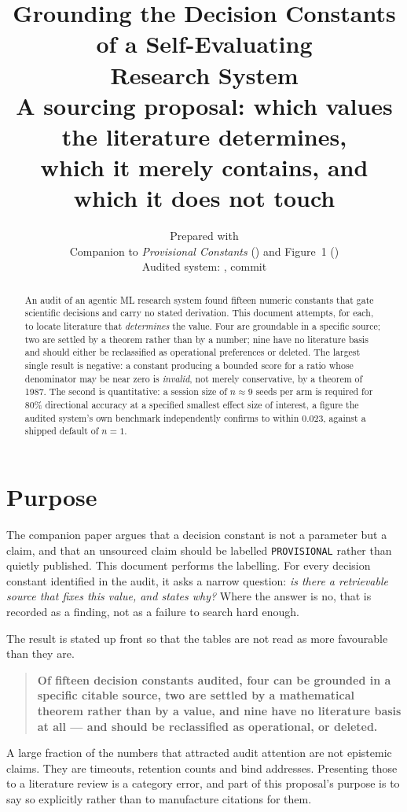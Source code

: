 \documentclass[11pt,letterpaper]{article}
\title{\textbf{Grounding the Decision Constants of a Self-Evaluating\\ Research System}\\[6pt]
\large A sourcing proposal: which values the literature determines,\\ which it
merely contains, and which it does not touch}
\author{
  \normalsize Prepared with \code{opencode}\\[3pt]
  \small Companion to \emph{Provisional Constants} (\code{paper.pdf}) and Figure~1
  (\code{flow.pdf})\\
  \small Audited system: \code{github.com/cloudcell/labloop}, commit \code{21d91f1}
}
\date{}
\newcommand{\code}[1]{\texttt{#1}}
\begin{document}
\maketitle

\begin{abstract}
An audit of an agentic ML research system found fifteen numeric constants that
gate scientific decisions and carry no stated derivation. This document attempts,
for each, to locate literature that \emph{determines} the value. Four are
groundable in a specific source; two are settled by a theorem rather than by a
number; nine have no literature basis and should either be reclassified as
operational preferences or deleted. The largest single result is negative: a
constant producing a bounded score for a ratio whose denominator may be near
zero is \emph{invalid}, not merely conservative, by a theorem of 1987. The
second is quantitative: a session size of $n \approx 9$ seeds per arm is required
for 80\% directional accuracy at a specified smallest effect size of interest, a
figure the audited system's own benchmark independently confirms to within
$0.023$, against a shipped default of $n = 1$.
\end{abstract}

\section{Purpose}

The companion paper argues that a decision constant is not a parameter but a
claim, and that an unsourced claim should be labelled \code{PROVISIONAL} rather
than quietly published. This document performs the labelling. For every decision
constant identified in the audit, it asks a narrow question: \emph{is there a
retrievable source that fixes this value, and states why?} Where the answer is
no, that is recorded as a finding, not as a failure to search hard enough.

The result is stated up front so that the tables are not read as more favourable
than they are.

\begin{quote}
\textbf{Of fifteen decision constants audited, four can be grounded in a
specific citable source, two are settled by a mathematical theorem rather than
by a value, and nine have no literature basis at all --- and should be
reclassified as operational, or deleted.}
\end{quote}

A large fraction of the numbers that attracted audit attention are not
epistemic claims. They are timeouts, retention counts and bind addresses.
Presenting those to a literature review is a category error, and part of this
proposal's purpose is to say so explicitly rather than to manufacture citations
for them.
\end{document}
